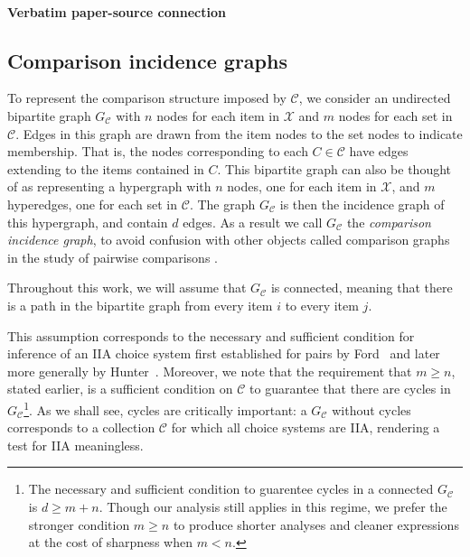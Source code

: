 \documentclass[10pt]{article}
\begin{document}
\paragraph{Verbatim paper-source connection}
\begin{ReviewVerbatim}
\subsection{Comparison incidence graphs}\label{subsection:comparison_graph}
	To represent the comparison structure imposed by $\mathcal{C}$, we consider an undirected bipartite graph $G_\mathcal{C}$ with $n$ nodes for each item in $\mathcal{X}$ and $m$ nodes for each set in $\mathcal{C}$. Edges in this graph are drawn from the item nodes to the set nodes to indicate membership. That is, the nodes corresponding to each $C \in \mathcal{C}$ have edges extending to the items contained in $C$. This bipartite graph can also be thought of as representing a hypergraph with $n$ nodes, one for each item in $\mathcal{X}$, and $m$ hyperedges, one for each set in $\mathcal{C}$. The graph $G_\mathcal{C}$ is then the incidence graph of this hypergraph, and contain $d$ edges. As a result we call $G_\mathcal{C}$ the {\it comparison incidence graph}, to avoid confusion with other objects called comparison graphs in the study of pairwise comparisons \cite{ford1957solution,negahban2016rank}.

	Throughout this work, we will assume that $G_\mathcal{C}$ is connected, meaning that there is a path in the bipartite graph from every item $i$ to every item $j$.

	This assumption corresponds to the necessary and sufficient condition for inference of an IIA choice system first established for pairs by Ford~\cite{ford1957solution} and later more generally by Hunter~\cite{hunter2004mm}. Moreover, we note that the requirement that $m \geq n$, stated earlier, is a sufficient condition on $\mathcal{C}$ to guarantee that there are cycles in $G_\mathcal{C}$\footnote{The necessary and sufficient condition to guarentee cycles in a connected $G_\mathcal{C}$ is $d \geq m + n$. Though our analysis still applies in this regime, we prefer the stronger condition $m \geq n$ to produce shorter analyses and cleaner expressions at the cost of sharpness when $m < n$.}. As we shall see, cycles are critically important: a $G_\mathcal{C}$ without cycles corresponds to a collection $\mathcal{C}$ for which all choice systems are IIA, rendering a test for IIA meaningless.


\end{ReviewVerbatim}
\end{document}
